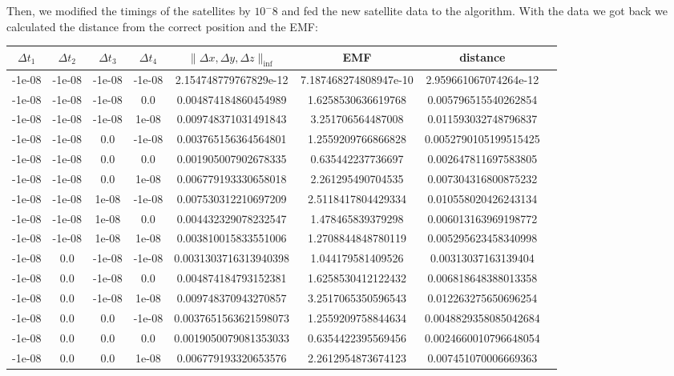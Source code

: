 \documentclass[a4paper]{article}
\begin{document}
Then, we modified the timings of the satellites by $10^-8$ and fed the new satellite data to the algorithm. With the data we got back we calculated the distance from the correct position and the EMF:
\begin{center}
	\begin{longtable}{@{}c|@{}c|@{}c|@{}c|@{}c|@{}c|@{}cX@{}}
		$\Delta t_1$ & $\Delta t_2$ & $\Delta t_3$ & $\Delta t_4$ & $\| \Delta x, \Delta y, \Delta z \|_{\inf}$ & EMF & distance\\ \hline
		-1e-08 & -1e-08 & -1e-08 & -1e-08 & 2.154748779767829e-12 & 7.187468274808947e-10 & 2.959661067074264e-12\\ \hline
		-1e-08 & -1e-08 & -1e-08 & 0.0 & 0.004874184860454989 & 1.6258530636619768 & 0.005796515540262854\\ \hline
		-1e-08 & -1e-08 & -1e-08 & 1e-08 & 0.009748371031491843 & 3.251706564487008 & 0.011593032748796837\\ \hline
		-1e-08 & -1e-08 & 0.0 & -1e-08 & 0.003765156364564801 & 1.2559209766866828 & 0.0052790105199515425\\ \hline
		-1e-08 & -1e-08 & 0.0 & 0.0 & 0.001905007902678335 & 0.635442237736697 & 0.002647811697583805\\ \hline
		-1e-08 & -1e-08 & 0.0 & 1e-08 & 0.006779193330658018 & 2.261295490704535 & 0.007304316800875232\\ \hline
		-1e-08 & -1e-08 & 1e-08 & -1e-08 & 0.007530312210697209& 2.5118417804429334& 0.010558020426243134\\ \hline
		-1e-08 & -1e-08 & 1e-08 & 0.0& 0.004432329078232547& 1.478465839379298& 0.006013163969198772\\ \hline
		-1e-08 & -1e-08 & 1e-08 & 1e-08 & 0.003810015833551006& 1.2708844848780119& 0.005295623458340998\\ \hline
		-1e-08 & 0.0 & -1e-08 & -1e-08 & 0.0031303716313940398& 1.044179581409526& 0.00313037163139404\\ \hline
		-1e-08 & 0.0 & -1e-08 & 0.0& 0.004874184793152381& 1.6258530412122432& 0.006818648388013358\\ \hline
		-1e-08 & 0.0 & -1e-08 & 1e-08 & 0.009748370943270857& 3.2517065350596543& 0.012263275650696254\\ \hline
		-1e-08 & 0.0 & 0.0 & -1e-08 & 0.0037651563621598073& 1.2559209758844634& 0.0048829358085042684\\ \hline
		-1e-08 & 0.0 & 0.0 & 0.0& 0.0019050079081353033& 0.6354422395569456& 0.0024660010796648054\\ \hline
		-1e-08 & 0.0 & 0.0 & 1e-08 & 0.006779193320653576& 2.2612954873674123& 0.007451070006669363\\ \hline

\end{longtable}
\end{center}
\end{document}
